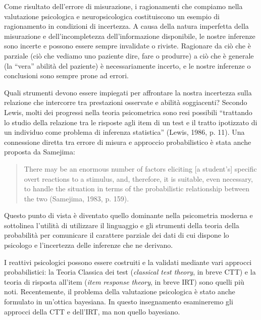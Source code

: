 Come risultato dell'errore di misurazione, i ragionamenti che compiamo nella valutazione psicologica e neuropsicologica costituiscono un esempio di ragionamento in condizioni di incertezza. A causa della natura imperfetta della misurazione e dell'incompletezza dell'informazione disponibile, le nostre inferenze sono incerte e possono essere sempre invalidate o riviste. Ragionare da ciò che è parziale (ciò che vediamo uno paziente dire, fare o produrre) a ciò che è generale (la ``vera'' abilità del paziente) è necessariamente incerto, e le nostre inferenze o conclusioni sono sempre prone ad errori.

Quali strumenti devono essere impiegati per affrontare la nostra incertezza sulla relazione che intercorre tra prestazioni osservate e abilità soggiacenti? Secondo Lewis, molti dei progressi nella teoria psicometrica sono resi possibili ``trattando lo studio della relazione tra le risposte agli item di un test e il tratto ipotizzato di un individuo come problema di inferenza statistica'' (Lewis, 1986, p. 11). Una connessione diretta tra errore di misura e approccio probabilistico è stata anche proposta da Samejima:
\begin{quote}
There may be an enormous number of factors eliciting [a student's] specific overt reactions to a stimulus, and, therefore, it is suitable, even necessary, to handle the situation in terms of the probabilistic relationship between the two (Samejima, 1983, p. 159).
\end{quote}
Questo punto di vista è diventato quello dominante nella psicometria moderna e sottolinea l'utilità di utilizzare il linguaggio e gli strumenti della teoria della probabilità per comunicare il carattere parziale dei dati di cui dispone lo psicologo e l'incertezza delle inferenze che ne derivano. 

I reattivi psicologici possono essere costruiti e la validati mediante vari approcci probabilistici: la Teoria Classica dei test (\emph{classical test theory}, in breve CTT) e la teoria di risposta all'item (\emph{item response theory}, in breve IRT) sono quelli più noti. 
Recentemente, il problema della valutazione psicologica è stato anche formulato in un'ottica bayesiana. 
In questo insegnamento esamineremo gli approcci della CTT e dell'IRT, ma non quello bayesiano.


